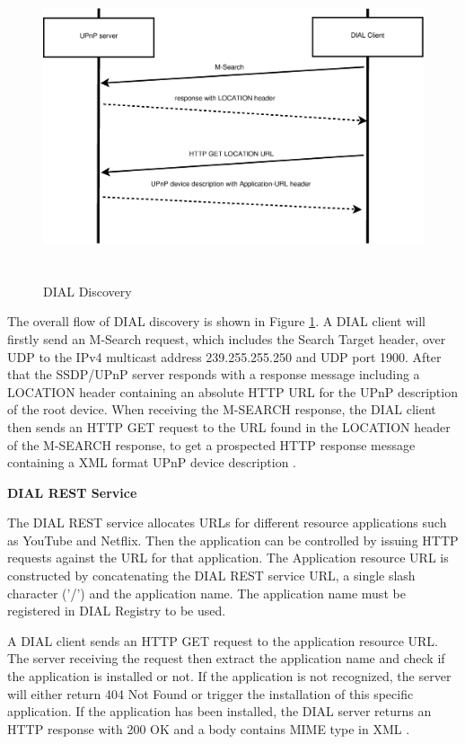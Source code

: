 \begin{figure}[htb] \centering 
\includegraphics[height=9cm]{charts/dial_discovery} 
\caption{DIAL Discovery \label{dial_discovery}} 
\end{figure} 

The overall flow of DIAL discovery is shown in Figure \ref{dial_discovery}. A
DIAL client will firstly send an M-Search request, which includes  the Search
Target header, over UDP to the IPv4 multicast address 239.255.255.250 and UDP
port 1900. After that the SSDP/UPnP server responds with a response message
including a LOCATION header containing an absolute HTTP URL for the UPnP
description of the root device. When receiving the M-SEARCH response, the DIAL
client then sends an HTTP GET request to the URL found in the LOCATION header
of the M-SEARCH response, to get a prospected HTTP response message containing
a XML format UPnP device description \cite{dial}. 

\textbf{DIAL REST Service}

The DIAL REST service allocates URLs for different resource applications such as 
YouTube and Netflix. Then the application can be controlled by issuing HTTP 
requests against the URL for that application. The Application resource URL is 
constructed by concatenating the DIAL REST service URL, a single slash character 
('/') and the application name. The application name must be registered in DIAL 
Registry to be used.

A DIAL client sends an HTTP GET request to the application resource URL. 
The server receiving the request then extract the application name and check if the 
application is installed or not. If the application is not recognized, the 
server will either return 404 Not Found or trigger the installation of this specific 
application. If the application has been installed, the DIAL server returns 
an HTTP response with 200 OK and a body contains MIME type in XML \cite{dial}.

